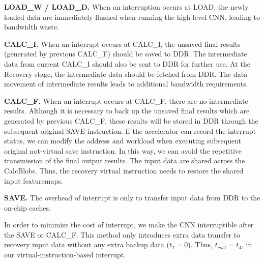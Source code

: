 \textbf{LOAD\_W / LOAD\_D. }
When an interruption occurs at LOAD, the newly loaded data are immediately flushed when running the high-level CNN, leading to bandwidth waste.

\textbf{CALC\_I.} 
When an interrupt occurs at CALC\_I, the unsaved final results (generated by previous CALC\_F) should be saved to DDR. The intermediate data from current CALC\_I should also be sent to DDR for further use. At the Recovery stage, the intermediate data should be fetched from DDR. The data movement of intermediate results leads to additional bandwidth requirements.


\textbf{CALC\_F.}
When an interrupt occurs at CALC\_F, there are no intermediate results. 
Although it is necessary to back up the unsaved final results which are generated by previous CALC\_F, these results will be stored in DDR through the subsequent original SAVE instruction.
If the accelerator can record the interrupt status, we can modify the address and workload when executing subsequent original not-virtual save instruction.
In this way, we can avoid the repetitive transmission of the final output results.
The input data are shared across the CalcBlobs. Thus, the recovery virtual instruction needs to restore the shared input featuremaps.



\textbf{SAVE.}
The overhead of interrupt is only to transfer input data from DDR to the on-chip caches. 

In order to minimize the cost of interrupt, we make the CNN interruptible after the SAVE or CALC\_F. This method only introduces extra data transfer to recovery input data without any extra backup data ($t_2 = 0$). Thus, $t_{cost} = t_4$, in our virtual-instruction-based interrupt.



